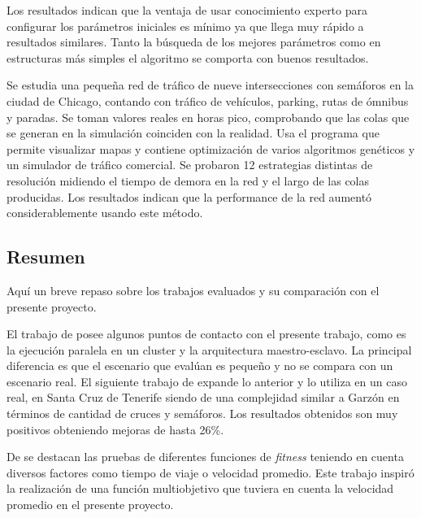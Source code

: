 \begin{itemize}
\begin{item}
Los resultados indican que la ventaja de usar conocimiento experto para configurar los parámetros iniciales es mínimo ya que llega muy rápido a resultados similares. Tanto la búsqueda de los mejores parámetros como en estructuras más simples el algoritmo se comporta con buenos resultados.

\end{item}	

\begin{item}

Se estudia una pequeña red de tráfico de nueve intersecciones con semáforos en la ciudad de Chicago, contando con tráfico de vehículos, parking, rutas de ómnibus y paradas.  
Se toman valores reales en horas pico, comprobando que las colas que se generan en la simulación coinciden con la realidad.
Usa el programa \citet{TRANSYT-7F} que permite visualizar mapas y contiene optimización de varios algoritmos genéticos y \citet{CORSIM}  un simulador de tráfico comercial.
Se probaron 12 estrategias distintas de resolución midiendo el tiempo de demora en la red y el largo de las colas producidas. Los resultados indican que la performance de la red aumentó considerablemente usando este método.	
\end{item}	
	
\end{itemize}


\subsection{Resumen}
Aquí un breve repaso sobre los trabajos evaluados y su comparación con el presente proyecto.

El trabajo de \citet{Sanchez2004} posee algunos puntos de contacto con el presente trabajo, como es la ejecución paralela en un cluster y la arquitectura maestro-esclavo. La principal diferencia es que el escenario que evalúan es pequeño y no se compara con un escenario real. El siguiente trabajo de \citet{Sanchez2008} expande lo anterior y lo utiliza en un caso real, en Santa Cruz de Tenerife siendo de una complejidad similar a Garzón en términos de cantidad de cruces y semáforos. Los resultados obtenidos son muy positivos obteniendo mejoras de hasta 26\%.

De \citet{Sanchez2010} se destacan las pruebas de diferentes funciones de \emph{fitness} teniendo en cuenta diversos factores como tiempo de viaje o velocidad promedio. Este trabajo inspiró la realización de una función multiobjetivo que tuviera en cuenta la velocidad promedio en el presente proyecto.

